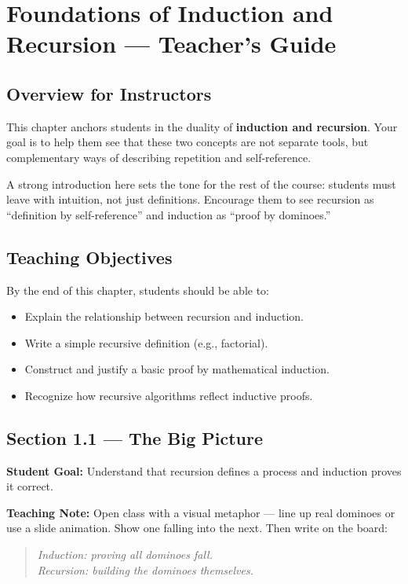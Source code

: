 \chapter{Foundations of Induction and Recursion — Teacher’s Guide}
\label{ch:foundations-teacher}

\section{Overview for Instructors}
This chapter anchors students in the duality of \textbf{induction and recursion}.
Your goal is to help them see that these two concepts are not separate tools,
but complementary ways of describing repetition and self-reference.

A strong introduction here sets the tone for the rest of the course:
students must leave with intuition, not just definitions.
Encourage them to see recursion as ``definition by self-reference''
and induction as ``proof by dominoes.''

\section{Teaching Objectives}
By the end of this chapter, students should be able to:
\begin{itemize}
  \item Explain the relationship between recursion and induction.
  \item Write a simple recursive definition (e.g., factorial).
  \item Construct and justify a basic proof by mathematical induction.
  \item Recognize how recursive algorithms reflect inductive proofs.
\end{itemize}

\section{Section 1.1 — The Big Picture}
\textbf{Student Goal:} Understand that recursion defines a process and induction proves it correct.

\textbf{Teaching Note:}
Open class with a visual metaphor — line up real dominoes or use a slide animation.
Show one falling into the next.
Then write on the board:

\begin{quote}
\textit{Induction: proving all dominoes fall.}\\
\textit{Recursion: building the dominoes themselves.}
\end{quote}

